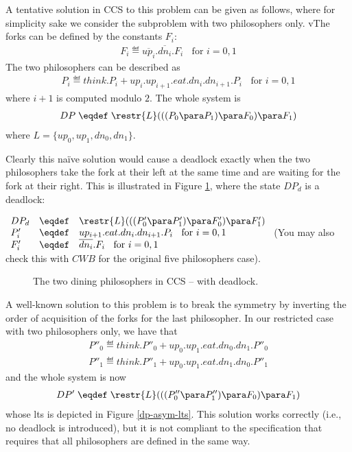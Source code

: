   A tentative solution in CCS to this problem can be given as follows, where for simplicity sake we consider the subproblem with two philosophers only. vThe forks can be defined by the constants $F_i$: 
  \begin{eqnarray*}
    F_i \eqdef  \overline{up_i}.\overline{dn_i}.F_i \; \;  \mbox{   for  }i = 0, 1  
  \end{eqnarray*}
  The two philosophers can be described as 
  \begin{eqnarray*}
    P_i \eqdef think.P_i +  up_i.up_{i+1}.eat.dn_i.dn_{i+1}.P_i  \; \;  \mbox{   for  }i = 0, 1 
  \end{eqnarray*}
  where $i+1$ is computed modulo $2$. 
  The whole system is 
  \begin{eqnarray*}
    DP \;  \eqdef \;  \restr{L}(((P_0\para P_1) \para F_0) \para F_1) 
  \end{eqnarray*}
  where $L = \{up_0, up_1, dn_0, dn_1\}$. 

  Clearly this na\"ive solution would cause a deadlock exactly when the two philosophers take the fork at their left at the same time and are waiting for the fork at their right. This is illustrated in Figure \ref{dp-dead-lts}, where the state $DP_d$ is a deadlock:

  $\begin{array}{llllllll}
      DP_d  & \eqdef  & \restr{L}(((P'_0\para P'_1) \para F'_0) \para F'_1) 
    \\
      P'_i & \eqdef &  up_{i+1}.eat.dn_i.dn_{i+1}.P_i  \; \;  \mbox{   for  }i = 0, 1
    \\
      F'_i & \eqdef & \overline{dn_i}.F_i \; \;  \mbox{   for  }i = 0, 1
    \\
 \end{array}$
  (You may also check this with $CWB$ for the original five philosophers case). 

  \begin{figure}[t]
    \centering
    \caption{The two dining philosophers in CCS -- with deadlock.}
    \label{dp-dead-lts}
  \end{figure}


  A well-known solution to this problem is to break the symmetry by inverting the order of acquisition of the forks for the last philosopher. In our restricted case with two philosophers only, we have that
  \begin{eqnarray*}
      P''_0 \eqdef think.P''_0 +  up_0.up_1.eat.dn_0.dn_1.P''_0  
    \\
      P''_1 \eqdef think.P''_1 +  up_0.up_1.eat.dn_1.dn_0.P''_1 
  \end{eqnarray*}
  and the whole system is now
  \begin{eqnarray*}
    DP' \;  \eqdef \;  \restr{L}(((P''_0\para P''_1) \para F_0) \para F_1) 
  \end{eqnarray*}
  whose lts is depicted in Figure \ref{dp-asym-lts}. This solution works correctly (i.e., no deadlock is introduced), but it is not compliant to the specification that requires that all philosophers are defined in the same way.


